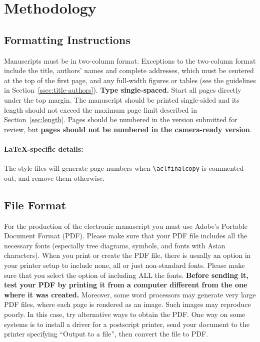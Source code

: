 \section{Methodology}
\label{sec:methodology}
 
 
 
 \subsection{Formatting Instructions}
 
 Manuscripts must be in two-column format.
 Exceptions to the two-column format include the title, authors' names and complete addresses, which must be centered at the top of the first page, and any full-width figures or tables (see the guidelines in Section~\ref{ssec:title-authors}).
 \textbf{Type single-spaced.}
 Start all pages directly under the top margin.
 The manuscript should be printed single-sided and its length should not exceed the maximum page limit described in Section~\ref{sec:length}.
 Pages should be numbered in the version submitted for review, but \textbf{pages should not be numbered in the camera-ready version}.
 
 \paragraph{\LaTeX-specific details:}
 The style files will generate page numbers when {\small\verb|\aclfinalcopy|} is commented out, and remove them otherwise.
 
 
 \subsection{File Format}
 \label{sect:pdf}
 
 For the production of the electronic manuscript you must use Adobe's Portable Document Format (PDF).
 Please make sure that your PDF file includes all the necessary fonts (especially tree diagrams, symbols, and fonts with Asian characters).
 When you print or create the PDF file, there is usually an option in your printer setup to include none, all or just non-standard fonts.
 Please make sure that you select the option of including ALL the fonts.
 \textbf{Before sending it, test your PDF by printing it from a computer different from the one where it was created.}
 Moreover, some word processors may generate very large PDF files, where each page is rendered as an image.
 Such images may reproduce poorly.
 In this case, try alternative ways to obtain the PDF.
 One way on some systems is to install a driver for a postscript printer, send your document to the printer specifying ``Output to a file'', then convert the file to PDF.
 
